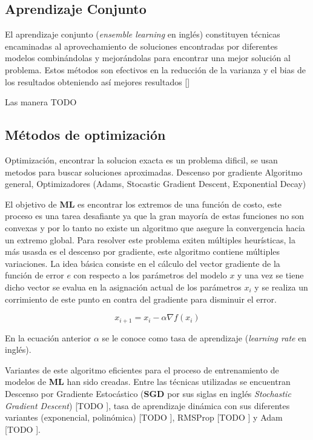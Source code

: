\subsection{Aprendizaje Conjunto}

El aprendizaje conjunto (\emph{ensemble learning} en inglés) constituyen técnicas encaminadas al aprovechamiento
de soluciones encontradas por diferentes modelos combinándolas y mejorándolas para encontrar una mejor solución 
al problema. Estos métodos son efectivos en la reducción de la varianza y el bias de los resultados obteniendo así
mejores resultados [\cite{dietterich2002ensemble}] 

Las manera TODO

\subsection{Métodos de optimización}

Optimización, encontrar la solucion exacta es un problema dificil, se usan metodos para buscar soluciones aproximadas.
Descenso por gradiente Algoritmo general, Optimizadores (Adams, Stocastic Gradient Descent, Exponential Decay)

El objetivo de \textbf{ML} es encontrar los extremos de una función de costo, este proceso es una tarea 
desafiante ya que la gran mayoría de estas funciones no son convexas y por lo tanto no existe un algoritmo
que asegure la convergencia hacia un extremo global. Para resolver este problema exiten múltiples heurísticas,
la más usasda es el descenso por gradiente, este algoritmo contiene múltiples variaciones. La idea básica consiste 
en el cálculo del vector gradiente de la función de error $e$ con respecto a los parámetros del modelo $x$ y una vez se 
tiene dicho vector se evalua en la asignación actual de los parámetros $x_i$ y se realiza un corrimiento de este punto 
en contra del gradiente para disminuir el error.

\begin{equation}
	x_{i+1} = x_i - \alpha \nabla f(x_i)
\end{equation}\label{eq:gradien_descent}

En la ecuación anterior $\alpha$ se le conoce como tasa de aprendizaje (\emph{learning rate} en inglés).

Variantes de este algoritmo eficientes para el proceso de entrenamiento de modelos de \textbf{ML} han sido 
creadas. Entre las técnicas utilizadas se encuentran Descenso por Gradiente Estocástico (\textbf{SGD} por sus siglas 
en inglés \emph{Stochastic Gradient Descent}) [TODO \cite{}], tasa de aprendizaje dinámica con sus diferentes
variantes (exponencial, polinómica) [TODO \cite{}], RMSProp [TODO \cite{}] y Adam [TODO \cite{}]. 

